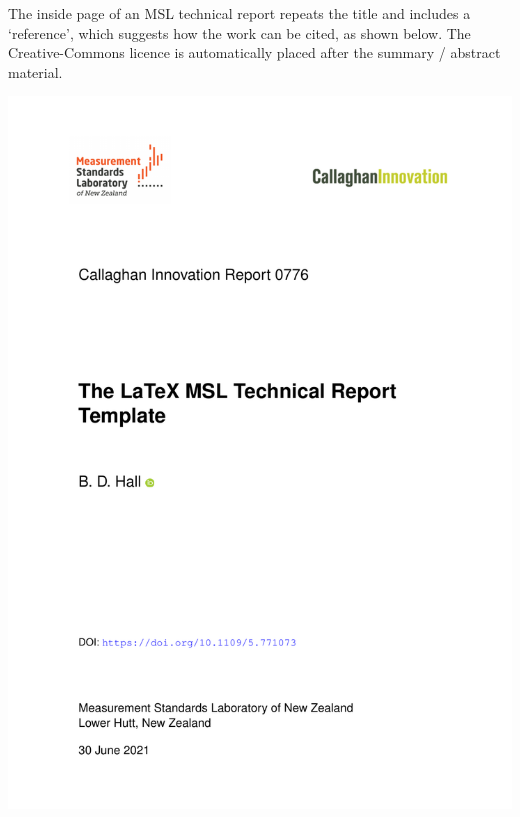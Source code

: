 {\newpage
The inside page of an MSL technical report repeats the title and includes a `reference', which suggests how the work can be cited, as shown below. The Creative-Commons licence is automatically placed after the summary / abstract material. 

\begin{center}
\includegraphics[scale=.5,page=2]{pictures/Report}
\end{center}

}%